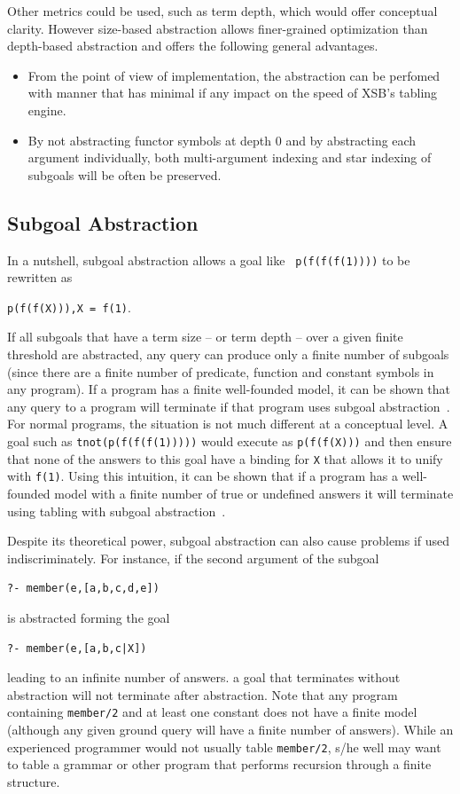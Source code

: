 Other metrics could be used, such as term depth, which would offer
conceptual clarity.  However size-based abstraction allows
finer-grained optimization than depth-based abstraction and offers the
following general advantages.
\begin{itemize}
\item From the point of view of implementation, the abstraction can be
  perfomed with manner that has minimal if any impact on the speed of
  XSB's tabling engine. 
\item By not abstracting functor symbols at depth 0 and by abstracting
  each argument individually, both multi-argument indexing and star
  indexing of subgoals will be often be preserved.
\end{itemize}

\subsection{Subgoal Abstraction} \label{sec:subg-abs}
%
In a nutshell, subgoal abstraction allows a goal like {\tt
  p(f(f(f(1))))} to be rewritten as 

{\tt p(f(f(X))),X = f(1)}.  

\noindent
If all subgoals that have a term size -- or term depth -- over a given
finite threshold are abstracted, any query can produce only a finite
number of subgoals (since there are a finite number of predicate,
function and constant symbols in any program). If a program has a
finite well-founded model, it can be shown that any query to a program
will terminate if that program uses subgoal abstraction~\cite{RigS14}.
%
For normal programs, the situation is not much different at a
conceptual level.  A goal such as {\tt tnot(p(f(f(f(1)))))} would
execute as {\tt p(f(f(X)))} and then ensure that none of the answers
to this goal have a binding for {\tt X} that allows it to unify with
{\tt f(1)}.  Using this intuition, it can be shown that if a program
has a well-founded model with a finite number of true or undefined
answers it will terminate using tabling with subgoal
abstraction~\cite{RigS13,RigS14}.

Despite its theoretical power, subgoal abstraction can also cause
problems if used indiscriminately.  For instance, if the second
argument of the subgoal
%
\begin{verbatim}
?- member(e,[a,b,c,d,e])
\end{verbatim}
%
is abstracted forming the goal
%
\begin{verbatim}
?- member(e,[a,b,c|X])
\end{verbatim}
%
leading to an infinite number of answers.  a goal that terminates
without abstraction will not terminate after abstraction.  Note that
any program containing {\tt member/2} and at least one constant does
not have a finite model (although any given ground query will have a
finite number of answers).  While an experienced programmer would not
usually table {\tt member/2}, s/he well may want to table a grammar or
other program that performs recursion through a finite structure.


